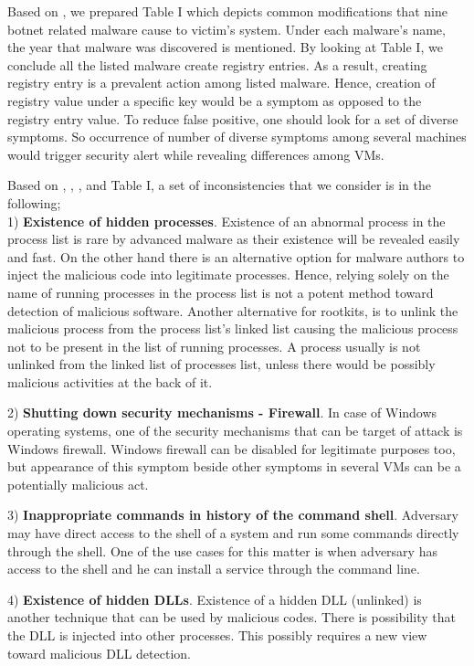 \documentclass[conference]{IEEEtran}
\begin{document}
Based on \cite{ref20}, we prepared Table I which depicts common modifications that nine botnet related malware cause to victim's system. Under each malware's name, the year that malware was discovered is mentioned. By looking at Table I, we conclude all the listed malware create registry entries. As a result, creating registry entry is a prevalent action among listed malware. Hence, creation of registry value under a specific key would be a symptom as opposed to the registry entry value. To reduce false positive, one should look for a set of diverse symptoms. So occurrence of number of diverse symptoms among several machines would trigger security alert while revealing differences among VMs.

Based on \cite{ref43}, \cite{ref44}, \cite{ref21}, \cite{ref35} and Table I, a set of inconsistencies that we consider is in the following; \\

1) \textbf{Existence of hidden processes}. Existence of an abnormal process in the process list is rare by advanced malware as their existence will be revealed easily and fast. On the other hand there is an alternative option for malware authors to inject the malicious code into legitimate processes. Hence, relying solely on the name of running processes in the process list is not a  potent method toward detection of malicious software. Another alternative for rootkits, is to unlink the malicious process from the process list's linked list causing the malicious process not to be present in the list of running processes. A process usually is not unlinked from the linked list of processes list, unless there would be possibly malicious activities at the back of it. 

2) \textbf{ Shutting down security mechanisms - Firewall}. In case of Windows operating systems, one of the security mechanisms that can be target of attack is Windows firewall. Windows firewall can be disabled for legitimate purposes too, but appearance of this symptom beside other symptoms in several VMs can be a potentially malicious act.

3) \textbf{Inappropriate commands in history of the command shell}. Adversary may have direct access to the shell of a system and run some commands directly through the shell. One of the use cases for this matter is when adversary has access to the shell and he can install a service through the command line. 

4) \textbf{Existence of hidden DLLs}. Existence of a hidden DLL (unlinked) is another technique that can be used by malicious codes. There is possibility that the DLL is injected into other processes. This possibly requires a new view toward malicious DLL detection. 
\end{document}
